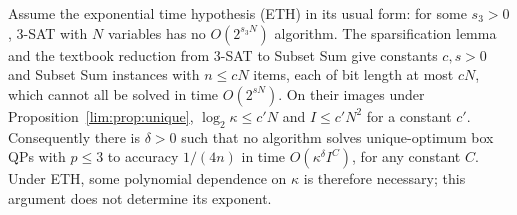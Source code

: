 \begin{remark}\label{lim:rem:eth}
Assume the exponential time hypothesis (ETH) in its usual form: for some
$s_3>0$, 3-SAT with $N$ variables has no $O(2^{s_3N})$ algorithm. The
sparsification lemma and the textbook reduction from 3-SAT to Subset Sum
\cite{ImpagliazzoPaturiZane2001,JansenLandLand2016} give constants
$c,s>0$ and Subset Sum instances with $n\le cN$ items, each of bit length
at most $cN$, which cannot all be solved in time $O(2^{sN})$. On their
images under Proposition~\ref{lim:prop:unique}, $\log_2\kappa\le c'N$ and
$I\le c'N^2$ for a constant $c'$. Consequently there is $\delta>0$ such
that no algorithm solves unique-optimum box QPs with $p\le3$ to accuracy
$1/(4n)$ in time $O(\kappa^\delta I^C)$, for any constant $C$. Under ETH,
some polynomial dependence on $\kappa$ is therefore necessary; this
argument does not determine its exponent.
\end{remark}

